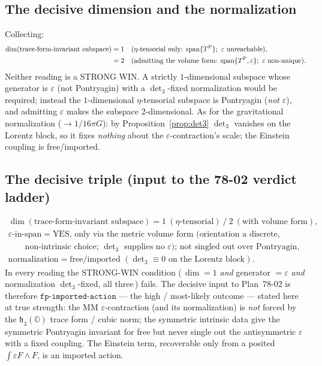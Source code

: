 \documentclass[11pt]{article}
\newcommand{\OO}{\mathbb{O}}
\newcommand{\hh}{\mathfrak{h}}
\theoremstyle{definition}\newtheorem{remark}{Remark}
\theoremstyle{definition}\newtheorem{definition}{Definition}
\theoremstyle{plain}\newtheorem{proposition}{Proposition}
\theoremstyle{plain}\newtheorem{lemma}{Lemma}
\begin{document}
\subsection{The decisive dimension and the normalization}
Collecting:
\begin{align}
  \dim(\text{trace-form-invariant subspace}) &= 1
  &&(\eta\text{-tensorial only: }\mathrm{span}\{T^{\rm P}\};\ \varepsilon\text{ unreachable}),\\
  &= 2 &&(\text{admitting the volume form: }\mathrm{span}\{T^{\rm P},\varepsilon\};\ \varepsilon\text{ non-unique}).
\end{align}
Neither reading is a STRONG WIN. A strictly $1$-dimensional subspace whose generator
is $\varepsilon$ (not Pontryagin) with a $\det\nolimits_3$-fixed normalization would
be required; instead the $1$-dimensional $\eta$-tensorial subspace is Pontryagin
(\emph{not} $\varepsilon$), and admitting $\varepsilon$ makes the subspace
$2$-dimensional. As for the gravitational normalization ($\to 1/16\pi G$): by
Proposition~\ref{prop:det3} $\det\nolimits_3$ vanishes on the Lorentz block, so it
fixes \emph{nothing} about the $\varepsilon$-contraction's scale; the Einstein
coupling is free/imported.

\subsection{The decisive triple (input to the 78-02 verdict ladder)}
\begin{equation}\boxed{
\begin{array}{l}
\dim(\text{trace-form-invariant subspace}) = 1\ (\eta\text{-tensorial})\ /\ 2\ (\text{with volume form}),\\[2pt]
\varepsilon\text{-in-span} = \text{YES, only via the metric volume form (orientation a discrete,}\\
\qquad\text{non-intrinsic choice; }\det\nolimits_3\text{ supplies no }\varepsilon\text{); not singled out over Pontryagin},\\[2pt]
\text{normalization} = \text{free/imported }(\det\nolimits_3\equiv0\text{ on the Lorentz block}).
\end{array}}
\end{equation}
In every reading the STRONG-WIN condition (\,$\dim=1$ \emph{and} generator
$=\varepsilon$ \emph{and} normalization $\det\nolimits_3$-fixed, all three\,) fails.
The decisive input to Plan~78-02 is therefore $\texttt{fp-imported-action}$ --- the
high / most-likely outcome --- stated here at true strength: the MM
$\varepsilon$-contraction (and its normalization) is \emph{not} forced by the
$\hh_3(\OO)$ trace form / cubic norm; the symmetric intrinsic data give the symmetric
Pontryagin invariant for free but never single out the antisymmetric $\varepsilon$
with a fixed coupling. The Einstein term, recoverable only from a posited
$\int\varepsilon F\wedge F$, is an imported action.
\end{document}

